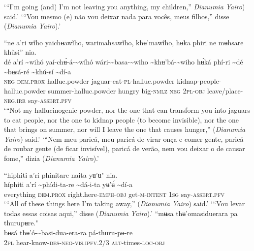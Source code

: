 \documentclass[output=paper,
modfonts,nonflat
]{langsci/langscibook}
\begin{document}
\glt ‘“I'm going (and) I'm not leaving you anything, my children,” \textit{Dianumia Yairo}) said.’
\glt ‘“Vou mesmo (e) não vou deixar nada para vocês, meus filhos,” disse (\textit{Dianumia Yairo}).’
\z

\ea “ne a’ri wĩho yaichʉawĩho, warimahsawĩho, khʉ'mawĩho, hʉka phiri ne mʉhsare khũsi” nia. \\[.3em]
\gll {\textasciitilde}dé	a’rí	{\textasciitilde}wihó{\footnotemark}	yaí-chʉ́-á-{\textasciitilde}wíhó	wári-{\textasciitilde}basa-{\textasciitilde}wiho {\textasciitilde}khʉ'bá-{\textasciitilde}wiho	hʉ́ká	phí-ri	{\textasciitilde}dé	{\textasciitilde}bʉsá-ré	{\textasciitilde}khú-sí	{\textasciitilde}dí-a\\
     \textsc{neg}	\textsc{dem.prox}	halluc.powder	jaguar-eat\textsc{-pl}-halluc.powder	kidnap-people-halluc.powder summer-halluc.powder	hungry	big\textsc{-nmlz}	\textsc{neg}	2\textsc{pl-obj}	leave/place\textsc{-neg.irr}	say-\textsc{assert.pfv}\\
\glt ‘“Not my hallucinogenic powder, nor the one that can transform you into jaguars to eat people, nor the one to kidnap people (to become invisible), nor the one that brings on summer, nor will I leave the one that causes hunger,” (\textit{Dianumia Yairo}) said.’
\glt ‘“Nem meu paricá, meu paricá de virar onça e comer gente, paricá de roubar gente (de ficar invisível), paricá de verão, nem vou deixar o de causar fome,” dizia (\textit{Dianumia Yairo}).’
\z 

\ea “hiphiti a’ri phinitare naita yʉ’ʉ" nia.  \\[.3em]
\gll híphiti	a’rí	{\textasciitilde}phídi-ta-re	{\textasciitilde}dá-i-ta	yʉ’ʉ́	{\textasciitilde}dí-a \\
     everything	\textsc{dem.prox}	right.here-\textsc{emph-obj}	get-\textsc{m-intent}	1\textsc{sg}	say-\textsc{assert.pfv}\\
\glt ‘“All of these things here I'm taking away,” (\textit{Dianumia Yairo}) said.’
\glt ‘“Vou levar todas essas coisas aqui,” disse (\textit{Dianumia Yairo}).’
\z 
\ea “mʉsa thʉ'omasiduerara pa thurupʉre." \\[.3em]
\gll {\textasciitilde}bʉsá	thʉ'ó-{\textasciitilde}basi-dua-era-ra	pá-thuru-pʉ-re \\
     2\textsc{pl}	hear-know-\textsc{des-neg-vis.ipfv.}2/3	\textsc{alt}-times\textsc{-loc-obj}\\
      
\end{document}
